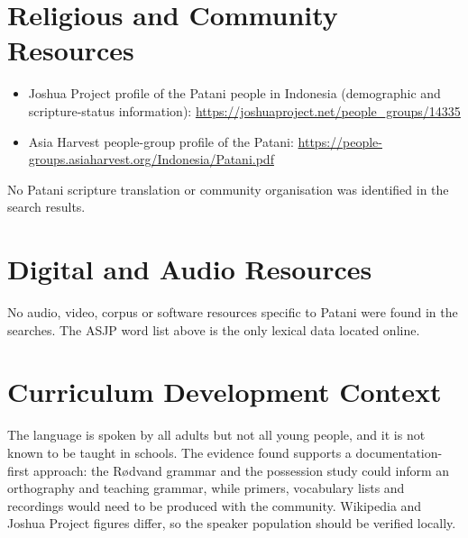 \documentclass[12pt]{article}
\begin{document}
\section{Religious and Community Resources}
\begin{itemize}
\item Joshua Project profile of the Patani people in Indonesia (demographic and scripture-status information): \url{https://joshuaproject.net/people_groups/14335}
\item Asia Harvest people-group profile of the Patani: \url{https://people-groups.asiaharvest.org/Indonesia/Patani.pdf}
\end{itemize}
No Patani scripture translation or community organisation was identified in the search results.

\section{Digital and Audio Resources}
No audio, video, corpus or software resources specific to Patani were found in the searches. The ASJP word list above is the only lexical data located online.

\section{Curriculum Development Context}
The language is spoken by all adults but not all young people, and it is not known to be taught in schools. The evidence found supports a documentation-first approach: the Rødvand grammar and the possession study could inform an orthography and teaching grammar, while primers, vocabulary lists and recordings would need to be produced with the community. Wikipedia and Joshua Project figures differ, so the speaker population should be verified locally.
\end{document}

